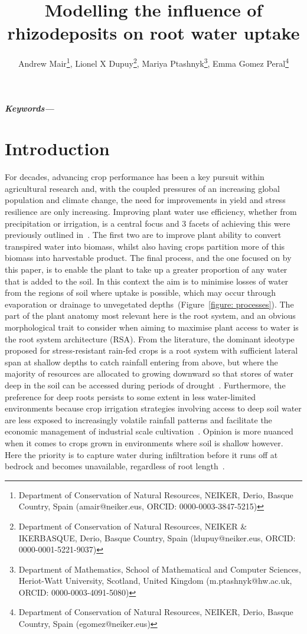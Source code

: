 \documentclass[11pt,a4paper]{article}
\title{Modelling the influence of rhizodeposits on root water uptake}
\author{
	Andrew Mair\thanks{Department of Conservation of Natural Resources, NEIKER, Derio, Basque Country, Spain ({amair@neiker.eus, ORCID: 0000-0003-3847-5215})},\;  
	Lionel X Dupuy\thanks{Department of Conservation of Natural Resources, NEIKER \& IKERBASQUE, Derio, Basque Country, Spain ({ldupuy@neiker.eus, ORCID: 0000-0001-5221-9037})},\; 
	Mariya Ptashnyk\thanks{Department of Mathematics, School of Mathematical and Computer Sciences, Heriot-Watt University,  Scotland, United Kingdom ({m.ptashnyk@hw.ac.uk, ORCID: 0000-0003-4091-5080})},\;
	Emma Gomez Peral\thanks{Department of Conservation of Natural Resources, NEIKER, Derio, Basque Country, Spain ({egomez@neiker.eus})}  
	}
\date{}
\numberwithin{equation}{section}
\providecommand{\keywords}[1]
{
	\small	
	\textbf{\textit{Keywords---}} #1
}
\begin{document}
\maketitle
\thispagestyle{empty}
\newpage	
\clearpage
{}
	
\begin{abstract} 
\end{abstract}

\keywords{}

\linenumbers

\section{Introduction}
For decades, advancing crop performance has been a key pursuit within agricultural research and, with the coupled pressures of an increasing global population and climate change, the need for improvements in yield and stress resilience are only increasing. Improving plant water use efficiency, whether from precipitation or irrigation, is a central focus and 3 facets of achieving this were previously outlined in~\citep{condon2004breeding}. The first two are to improve plant ability to convert transpired water into biomass, whilst also having crops partition more of this biomass into harvestable product. The final process, and the one focused on by this paper, is to enable the plant to take up a greater proportion of any water that is added to the soil. In this context the aim is to minimise losses of water from the regions of soil where uptake is possible, which may occur through evaporation or drainage to unvegetated depths~(Figure~\ref{figure: processes}). The part of the plant anatomy most relevant here is the root system, and an obvious morphological trait to consider when aiming to maximise plant access to water is the root system architecture (RSA). From the literature, the dominant ideotype proposed for stress-resistant rain-fed crops is a root system with sufficient lateral span at shallow depths to catch rainfall entering from above, but where the majority of resources are allocated to growing downward so that stores of water deep in the soil can be accessed during periods of drought~\citep{lynch2013steep, uga2013control, lynch2015opportunities}. Furthermore, the preference for deep roots persists to some extent in less water-limited environments because crop irrigation strategies involving access to deep soil water are less exposed to increasingly volatile rainfall patterns and facilitate the economic management of industrial scale cultivation~\citep{wasson2012traits}. Opinion is more nuanced when it comes to crops grown in environments where soil is shallow however. Here the priority is to capture water during infiltration before it runs off at bedrock and becomes unavailable, regardless of root length~\citep{tardieu2012any, wasson2012traits}.
\end{document}
